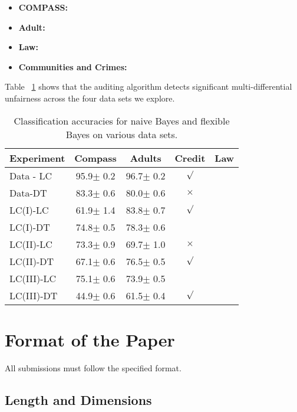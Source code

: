 \documentclass{article}
\begin{document}
\begin{itemize}
\item \textbf{COMPASS:}
\item \textbf{Adult:}
\item \textbf{Law:}
\item \textbf{Communities and Crimes:}
\end{itemize}

Table ~\ref{table1} shows that the auditing algorithm detects significant multi-differential unfairness across the four data sets we explore. 

\begin{table}[t]
\caption{Classification accuracies for naive Bayes and flexible
Bayes on various data sets.}
\label{table1}
\vskip 0.15in
\begin{center}
\begin{small}
\begin{sc}
\begin{tabular}{lcccr}
\toprule
Experiment & Compass & Adults & Credit & Law \\
\midrule
Data - LC    & 95.9$\pm$ 0.2& 96.7$\pm$ 0.2& $\surd$ \\
Data-DT & 83.3$\pm$ 0.6& 80.0$\pm$ 0.6& $\times$\\
LC(I)-LC    & 61.9$\pm$ 1.4& 83.8$\pm$ 0.7& $\surd$ \\
LC(I)-DT    & 74.8$\pm$ 0.5& 78.3$\pm$ 0.6&         \\
 LC(II)-LC    & 73.3$\pm$ 0.9& 69.7$\pm$ 1.0& $\times$\\
LC(II)-DT      & 67.1$\pm$ 0.6& 76.5$\pm$ 0.5& $\surd$ \\
LC(III)-LC      & 75.1$\pm$ 0.6& 73.9$\pm$ 0.5&         \\
LC(III)-DT   & 44.9$\pm$ 0.6& 61.5$\pm$ 0.4& $\surd$ \\
\bottomrule
\end{tabular}
\end{sc}
\end{small}
\end{center}
\vskip -0.1in
\end{table}

\section{Format of the Paper}

All submissions must follow the specified format.

\subsection{Length and Dimensions}
\end{document}
